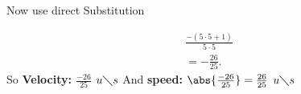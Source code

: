 \documentclass{report}
\begin{document}
        \bigbreak \noindent 
        Now use direct Substitution

        \begin{align*}
            \frac{- (5 \cdot 5 + 1)}{5 \cdot 5} \\ 
            = - \frac{26}{25}
        .\end{align*}
        \bigbreak \noindent 
        So \textbf{Velocity: $ \frac{-26}{25}$ $u \diagdown s$} 
        \bigbreak \noindent 
        And \textbf{speed: $\abs{ \frac{-26}{25}} = \frac{26}{25}$ $u \diagdown s$ }
\end{document}
